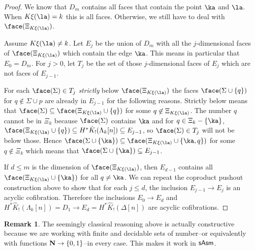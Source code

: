 \documentclass{amsart}
\theoremstyle{plain}
\theoremstyle{definition}
\newtheorem{remark}[theorem]{Remark}
\newcommand\hide[1]{}
\newcommand\set[1]{\left\{#1\right\}}
\newcommand\ri{^*}
\begin{document}
{\begin{proof}
We know that $D_m$ contains all faces that contain the point $\ka$ and $\la$. When $K\xi(\la) = k$ this is all faces. Otherwise, we still have to deal with $\face(\Xi_{K\xi(\la)})$.

Assume $K\xi(\la)\neq k$. Let $E_j$ be the union of $D_m$ with all the $j$-dimensional faces of $\face(\Xi_{K\xi(\la)})$ which contain the edge $\ka$. This means in particular that $E_0 = D_m$. For $j>0$, let $T_j$ be the set of those $j$-dimensional faces of $E_j$ which are not faces of $E_{j-1}$.

For each $\face(\Sigma)\in T_j$ \emph{strictly} below $\face(\Xi_{K\xi(\la)})$ the faces $\face(\Sigma\cup \set q)$ for $q\not\in \Sigma\cup p$ are already in $E_{j-1}$ for the following reasons. Strictly below means that $\face(\Sigma)\subseteq \face(\Xi_{K\xi(\la)}\cup\set{ q } )$ for some $q\not\in \Xi_{K\xi(\la)}$. The number $q$ cannot be in $\Xi_k$ because $\face(\Sigma)$ contains $\ka$ and for $q\in \Xi_k-\set \ka$, $\face(\Xi_{K\xi(\la)}\cup\set{ q } )\subseteq H\ri\hat K_!(\Lambda_k[n])\subseteq E_{j-1}$, so $\face(\Sigma)\in T_j$ will not be below those. Hence $\face(\Sigma\cup\set \ka)\subseteq \face(\Xi_{K\xi(\la)}\cup\set{ \ka,q })$ for some $q\not\in\Xi_k$ which means that $\face(\Sigma\cup\set \ka)\subseteq E_{j-1}$.

If $d\leq m$ is the dimension of $\face(\Xi_{K\xi(\la)})$, then $E_{d-1}$ contains all $\face(\Xi_{K\xi(\la)}\cup \set{\ka})$ for all $q\neq \ka$. We can repeat the coproduct pushout construction above to show that for each $j\leq d$, the inclusion $E_{j-1} \to E_j$ is an acyclic cofibration. Therefore the inclusions $E_0 \to E_d$ and $H\ri\hat K_!(\Lambda_k[n])=D_1 \to E_d = H\ri\hat K_!(\Delta[n])$ are acyclic cofibrations. \end{proof}
}


\begin{remark} The seemingly classical reasoning above is actually constructive because we are working with finite and decidable sets of number--or equivalently with functions $\nno \to \set{0,1}$--in every case. This makes it work in $\mathsf{sAsm}$.
\end{remark}
\end{document}
